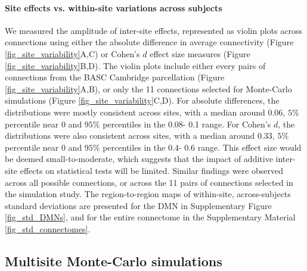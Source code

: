 \documentclass[authoryear]{elsarticle}
\begin{document}
\paragraph{Site effects vs. within-site variations across subjects} We measured the amplitude of inter-site effects, represented as violin plots across connections using either the absolute difference in average connectivity (Figure \ref{fig_site_variability}A,C) or Cohen's $d$ effect size measures (Figure \ref{fig_site_variability}B,D). The violin plots include either every pairs of
connections from the BASC Cambridge parcellation (Figure \ref{fig_site_variability}A,B), or only the 11 connections selected for Monte-Carlo
simulations (Figure \ref{fig_site_variability}C,D). For absolute differences, the distributions were mostly consistent across sites, with a
median around 0.06, $5\%$ percentile near 0 and $95\%$ percentiles in the 0.08-
0.1 range. For Cohen's $d$, the distributions were also consistent across sites, with a
median around 0.33, $5\%$ percentile near 0 and $95\%$ percentiles in the 0.4-
0.6 range. This effect size would be deemed small-to-moderate, which suggests that the impact of additive inter-site effects on
statistical tests will be limited. Similar findings were observed across all possible connections, or across the 11 pairs of
connections selected in the simulation study. The region-to-region maps of within-site, across-subjects standard
deviations are presented for the DMN in Supplementary Figure \ref{fig_std_DMNs},
and for the entire connectome in the Supplementary Material
\ref{fig_std_connectomes}. 

\subsection{Multisite Monte-Carlo simulations}
\end{document}
